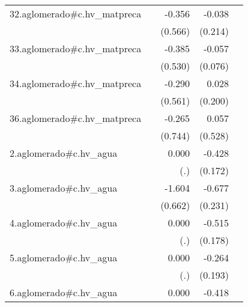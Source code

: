 {\begin{longtable}{l*{4}{D{.}{.}{-1}}}
\addlinespace
32.aglomerado#c.hv\_matpreca&                     &      -0.356         &      -0.038         &                     \\
            &                     &     (0.566)         &     (0.214)         &                     \\
\addlinespace
33.aglomerado#c.hv\_matpreca&                     &      -0.385         &      -0.057         &                     \\
            &                     &     (0.530)         &     (0.076)         &                     \\
\addlinespace
34.aglomerado#c.hv\_matpreca&                     &      -0.290         &       0.028         &                     \\
            &                     &     (0.561)         &     (0.200)         &                     \\
\addlinespace
36.aglomerado#c.hv\_matpreca&                     &      -0.265         &       0.057         &                     \\
            &                     &     (0.744)         &     (0.528)         &                     \\
\addlinespace
2.aglomerado#c.hv\_agua&                     &       0.000         &      -0.428\sym{*}  &                     \\
            &                     &         (.)         &     (0.172)         &                     \\
\addlinespace
3.aglomerado#c.hv\_agua&                     &      -1.604\sym{*}  &      -0.677\sym{**} &                     \\
            &                     &     (0.662)         &     (0.231)         &                     \\
\addlinespace
4.aglomerado#c.hv\_agua&                     &       0.000         &      -0.515\sym{**} &                     \\
            &                     &         (.)         &     (0.178)         &                     \\
\addlinespace
5.aglomerado#c.hv\_agua&                     &       0.000         &      -0.264         &                     \\
            &                     &         (.)         &     (0.193)         &                     \\
\addlinespace
6.aglomerado#c.hv\_agua&                     &       0.000         &      -0.418\sym{*}  &                     \\

\end{longtable}}
